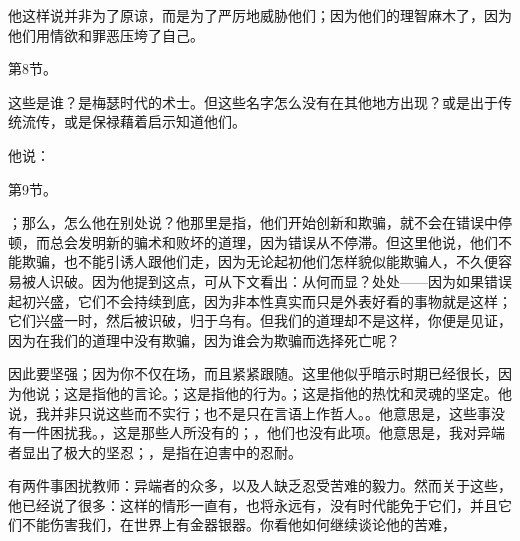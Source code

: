他这样说并非为了原谅，而是为了严厉地威胁他们；因为他们的理智麻木了，因为他们用情欲和罪恶压垮了自己。\par

第8节。\par

这些是谁？是梅瑟时代的术士。但这些名字怎么没有在其他地方出现？或是出于传统流传，或是保禄藉着启示知道他们。\par

他说：\par

第9节。\par

；那么，怎么他在别处说？他那里是指，他们开始创新和欺骗，就不会在错误中停顿，而总会发明新的骗术和败坏的道理，因为错误从不停滞。但这里他说，他们不能欺骗，也不能引诱人跟他们走，因为无论起初他们怎样貌似能欺骗人，不久便容易被人识破。因为他提到这点，可从下文看出：从何而显？处处——因为如果错误起初兴盛，它们不会持续到底，因为非本性真实而只是外表好看的事物就是这样；它们兴盛一时，然后被识破，归于乌有。但我们的道理却不是这样，你便是见证，因为在我们的道理中没有欺骗，因为谁会为欺骗而选择死亡呢？\par

因此要坚强；因为你不仅在场，而且紧紧跟随。这里他似乎暗示时期已经很长，因为他说；这是指他的言论。；这是指他的行为。；这是指他的热忱和灵魂的坚定。他说，我并非只说这些而不实行；也不是只在言语上作哲人。。他意思是，这些事没有一件困扰我。，这是那些人所没有的；，他们也没有此项。他意思是，我对异端者显出了极大的坚忍；，是指在迫害中的忍耐。\par

\par

有两件事困扰教师：异端者的众多，以及人缺乏忍受苦难的毅力。然而关于这些，他已经说了很多：这样的情形一直有，也将永远有，没有时代能免于它们，并且它们不能伤害我们，在世界上有金器银器。你看他如何继续谈论他的苦难，\par

